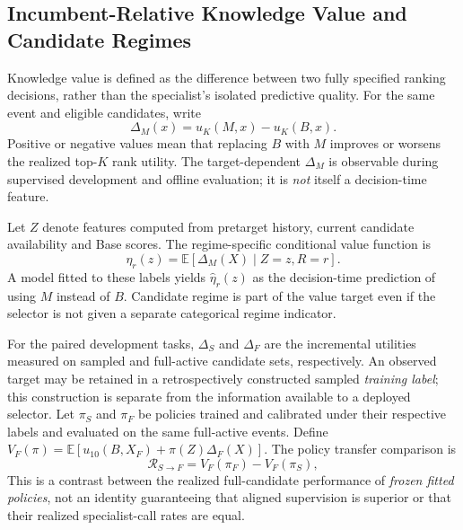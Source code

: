 \subsection{Incumbent-Relative Knowledge Value and Candidate Regimes}
\label{sec:relative-utility}
\label{sec:conditional-utility}

Knowledge value is defined as the difference between two fully specified ranking decisions, rather than the specialist's isolated predictive quality. For the same event and eligible candidates, write
\begin{equation}
    \Delta_M(x)=u_K(M,x)-u_K(B,x).
    \label{eq:delta-memory}
\end{equation}
Positive or negative values mean that replacing $B$ with $M$ improves or worsens the realized top-$K$ rank utility. The target-dependent $\Delta_M$ is observable during supervised development and offline evaluation; it is \emph{not} itself a decision-time feature.

Let $Z$ denote features computed from pretarget history, current candidate availability and Base scores. The regime-specific conditional value function is
\begin{equation}
    \eta_r(z)
    =\mathbb{E}\!\left[\Delta_M(X)\mid Z=z,R=r\right].
    \label{eq:eta}
\end{equation}
A model fitted to these labels yields $\hat{\eta}_r(z)$ as the decision-time prediction of using $M$ instead of $B$. Candidate regime is part of the value target even if the selector is not given a separate categorical regime indicator.

For the paired development tasks, $\Delta_S$ and $\Delta_F$ are the incremental utilities measured on sampled and full-active candidate sets, respectively. An observed target may be retained in a retrospectively constructed sampled \emph{training label}; this construction is separate from the information available to a deployed selector. Let $\pi_S$ and $\pi_F$ be policies trained and calibrated under their respective labels and evaluated on the same full-active events. Define $V_F(\pi)=\mathbb{E}[u_{10}(B,X_F)+\pi(Z)\Delta_F(X)]$. The policy transfer comparison is
\begin{equation}
    \mathcal{R}_{S\rightarrow F}
    =V_F(\pi_F)-V_F(\pi_S),
    \label{eq:candidate-supervision-transfer}
\end{equation}
This is a contrast between the realized full-candidate performance of \emph{frozen fitted policies}, not an identity guaranteeing that aligned supervision is superior or that their realized specialist-call rates are equal.

